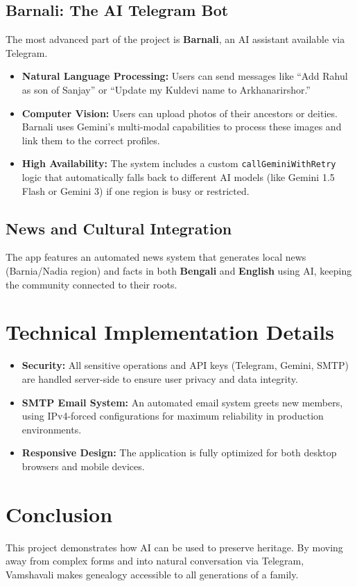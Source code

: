 \documentclass[11pt,a4paper]{article}
\begin{document}
\subsection{Barnali: The AI Telegram Bot}
The most advanced part of the project is \textbf{Barnali}, an AI assistant available via Telegram.
\begin{itemize}
    \item \textbf{Natural Language Processing:} Users can send messages like ``Add Rahul as son of Sanjay'' or ``Update my Kuldevi name to Arkhanarirshor.''
    \item \textbf{Computer Vision:} Users can upload photos of their ancestors or deities. Barnali uses Gemini's multi-modal capabilities to process these images and link them to the correct profiles.
    \item \textbf{High Availability:} The system includes a custom \texttt{callGeminiWithRetry} logic that automatically falls back to different AI models (like Gemini 1.5 Flash or Gemini 3) if one region is busy or restricted.
\end{itemize}

\subsection{News and Cultural Integration}
The app features an automated news system that generates local news (Barnia/Nadia region) and facts in both \textbf{Bengali} and \textbf{English} using AI, keeping the community connected to their roots.

\section{Technical Implementation Details}
\begin{itemize}
    \item \textbf{Security:} All sensitive operations and API keys (Telegram, Gemini, SMTP) are handled server-side to ensure user privacy and data integrity.
    \item \textbf{SMTP Email System:} An automated email system greets new members, using IPv4-forced configurations for maximum reliability in production environments.
    \item \textbf{Responsive Design:} The application is fully optimized for both desktop browsers and mobile devices.
\end{itemize}

\section{Conclusion}
This project demonstrates how AI can be used to preserve heritage. By moving away from complex forms and into natural conversation via Telegram, Vamshavali makes genealogy accessible to all generations of a family.
\end{document}
